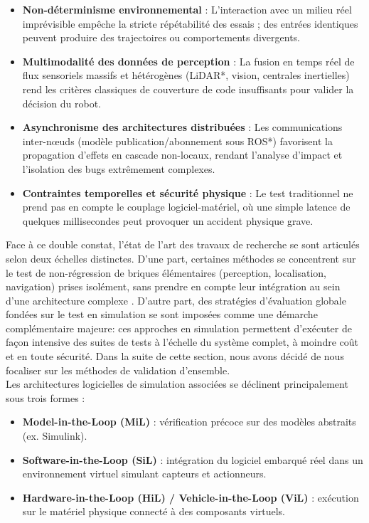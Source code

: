 \begin{itemize}
    \item \textbf{Non-déterminisme environnemental} : L'interaction avec un milieu réel imprévisible empêche la stricte répétabilité des essais ; des entrées identiques peuvent produire des trajectoires ou comportements divergents.
    \item \textbf{Multimodalité des données de perception} : La fusion en temps réel de flux sensoriels massifs et hétérogènes (LiDAR*, vision, centrales inertielles) rend les critères classiques de couverture de code insuffisants pour valider la décision du robot.
    \item \textbf{Asynchronisme des architectures distribuées} : Les communications inter-nœuds (modèle publication/abonnement sous ROS*) favorisent la propagation d'effets en cascade non-locaux, rendant l'analyse d'impact et l'isolation des bugs extrêmement complexes.
    \item \textbf{Contraintes temporelles et sécurité physique} : Le test traditionnel ne prend pas en compte le couplage logiciel-matériel, où une simple latence de quelques millisecondes peut provoquer un accident physique grave.\\
\end{itemize}

Face à ce double constat, l'état de l'art des travaux de recherche se sont articulés selon deux échelles distinctes. D'une part, certaines méthodes se concentrent sur le test de non-régression de briques élémentaires (perception, localisation, navigation) prises isolément, sans prendre en compte leur intégration au sein d'une architecture complexe \cite{2021TOU30119a}. D'autre part, des stratégies d'évaluation globale fondées sur le test en simulation se sont imposées comme une démarche complémentaire majeure: ces approches en simulation permettent d'exécuter de façon intensive des suites de tests à l'échelle du système complet, à moindre coût et en toute sécurité. Dans la suite de cette section, nous avons décidé de nous focaliser sur les méthodes de validation d'ensemble. \\

Les architectures logicielles de simulation associées se déclinent principalement sous trois formes \cite{2021TOU30119b} :\\

\begin{itemize}
    \item \textbf{Model-in-the-Loop (MiL)} : vérification précoce sur des modèles abstraits (ex. Simulink).
    \item \textbf{Software-in-the-Loop (SiL)} : intégration du logiciel embarqué réel dans un environnement virtuel simulant capteurs et actionneurs.
    \item \textbf{Hardware-in-the-Loop (HiL) / Vehicle-in-the-Loop (ViL)} : exécution sur le matériel physique connecté à des composants virtuels.\\
\end{itemize}

